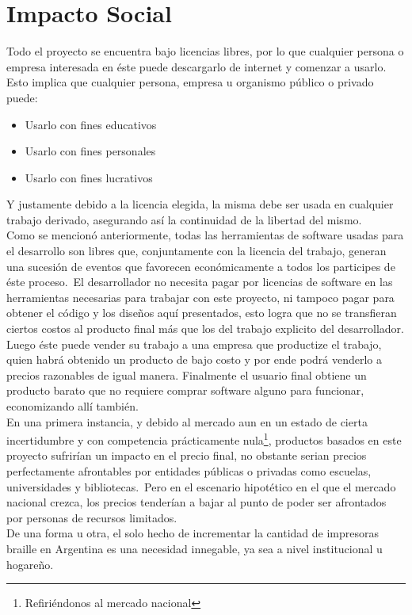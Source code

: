 \chapter{Impacto Social}

Todo el proyecto se encuentra bajo licencias libres, por lo que cualquier
persona o empresa interesada en \'este puede descargarlo de internet y
comenzar a usarlo. Esto implica que cualquier persona, empresa u organismo
p\'ublico o privado puede:

\begin{itemize}
 \item Usarlo con fines educativos
 \item Usarlo con fines personales
 \item Usarlo con fines lucrativos
\end{itemize}

Y justamente debido a la licencia elegida, la misma debe ser usada en cualquier
trabajo derivado, asegurando as\'i la continuidad de la libertad del mismo.\\

Como se mencion\'o anteriormente, todas las herramientas de software usadas
para el desarrollo son libres que, conjuntamente con la licencia del trabajo,
generan una sucesi\'on de eventos que favorecen econ\'omicamente a todos los
participes de \'este proceso.\
El desarrollador no necesita pagar por licencias de software en las
herramientas necesarias para trabajar con este proyecto, ni tampoco pagar para
obtener el c\'odigo y los dise\~nos aqu\'i presentados, esto logra que no se
transfieran ciertos costos al producto final m\'as que los del trabajo
explicito
del desarrollador. Luego \'este puede vender su trabajo a una empresa que
productize el trabajo, quien habr\'a obtenido un producto de bajo costo y por
ende podr\'a venderlo a precios razonables de igual manera. Finalmente el
usuario final obtiene un producto barato que no requiere comprar software
alguno para funcionar, economizando all\'i tambi\'en.\\

En una primera instancia, y debido al mercado aun en un estado de cierta
incertidumbre y con competencia pr\'acticamente nula\footnote{Refiri\'endonos
al
mercado nacional}, productos basados en este proyecto sufrir\'ian un impacto en
el precio final, no obstante serian precios perfectamente afrontables por
entidades p\'ublicas o privadas como escuelas, universidades y bibliotecas.\ 
Pero en el escenario hipot\'etico en el que el mercado nacional crezca, los
precios tender\'ian a bajar al punto de poder ser afrontados por personas de
recursos limitados.\\ 

De una forma u otra, el solo hecho de incrementar la cantidad de impresoras
braille en Argentina es una necesidad innegable, ya sea a nivel institucional u
hogare\~no.\\